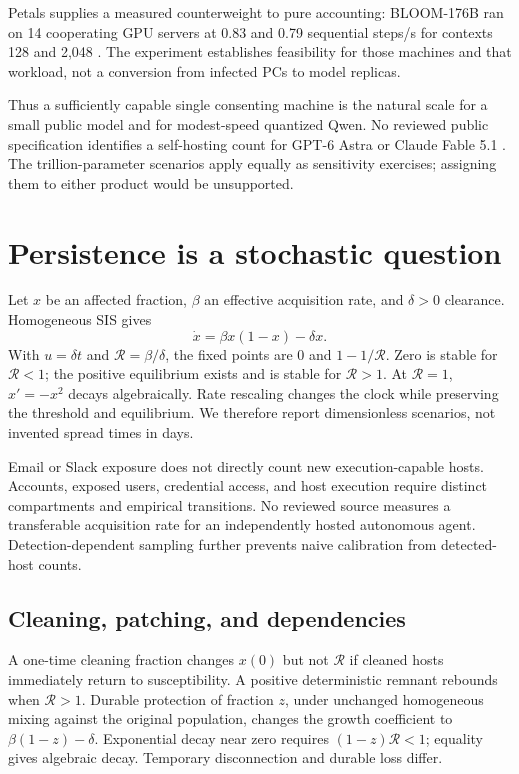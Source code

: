 \documentclass[10pt,twocolumn]{article}
\newcommand{\R}{\mathcal R}
\begin{document}
Petals supplies a measured counterweight to pure accounting: BLOOM-176B ran on 14 cooperating GPU servers at 0.83 and 0.79 sequential steps/s for contexts 128 and 2,048 \citep{petals}. The experiment establishes feasibility for those machines and that workload, not a conversion from infected PCs to model replicas.

Thus a sufficiently capable single consenting machine is the natural scale for a small public model and for modest-speed quantized Qwen. No reviewed public specification identifies a self-hosting count for GPT-6 Astra or Claude Fable 5.1 \citep{astra,fable}. The trillion-parameter scenarios apply equally as sensitivity exercises; assigning them to either product would be unsupported.

\section{Persistence is a stochastic question}
Let $x$ be an affected fraction, $\beta$ an effective acquisition rate, and $\delta>0$ clearance. Homogeneous SIS gives
\begin{equation}
\dot x=\beta x(1-x)-\delta x.
\end{equation}
With $u=\delta t$ and $\R=\beta/\delta$, the fixed points are $0$ and $1-1/\R$. Zero is stable for $\R<1$; the positive equilibrium exists and is stable for $\R>1$. At $\R=1$, $x'=-x^2$ decays algebraically. Rate rescaling changes the clock while preserving the threshold and equilibrium. We therefore report dimensionless scenarios, not invented spread times in days.

Email or Slack exposure does not directly count new execution-capable hosts. Accounts, exposed users, credential access, and host execution require distinct compartments and empirical transitions. No reviewed source measures a transferable acquisition rate for an independently hosted autonomous agent. Detection-dependent sampling further prevents naive calibration from detected-host counts.

\subsection{Cleaning, patching, and dependencies}
A one-time cleaning fraction changes $x(0)$ but not $\R$ if cleaned hosts immediately return to susceptibility. A positive deterministic remnant rebounds when $\R>1$. Durable protection of fraction $z$, under unchanged homogeneous mixing against the original population, changes the growth coefficient to $\beta(1-z)-\delta$. Exponential decay near zero requires $(1-z)\R<1$; equality gives algebraic decay. Temporary disconnection and durable loss differ.
\end{document}
